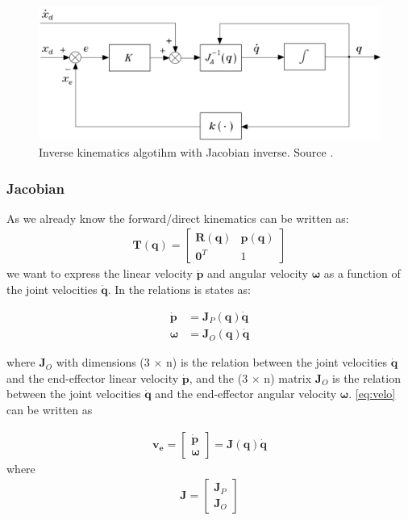 \begin{figure}[htbp]
  \centering
  \includegraphics[width=.9\textwidth]{img/inverseKin.png}
  \caption{Inverse kinematics algotihm with Jacobian inverse. Source \cite{Siciliano}.}
  \label{fig:inverseAlgo}
\end{figure}


\subsubsection*{Jacobian}
As we already know the forward/direct kinematics can be written as:
\begin{align*}
    \bm{T}(\bm{q}) = 
    \begin{bmatrix}
        \bm{R}(\bm{q}) & \bm{p}(\bm{q})\\
        \bm{0}^T & 1
    \end{bmatrix}
\end{align*}
we want to express the linear velocity $\dot{\bm{p}}$ and angular velocity $\bm{\omega}$ as a function of the joint velocities $\dot{\bm{q}}$. In \cite{Siciliano} the relations is states as:

\begin{equation}
    \begin{aligned}\label{eq:velo}
        \dot{\bm{p}} &= \bm{J}_P(\bm{q})\dot{\bm{q}}\\
        \bm{\omega} &= \bm{J}_O(\bm{q})\dot{\bm{q}}
    \end{aligned}
\end{equation}

where $\bm{J}_O$ with dimensions (3 $\times$ n) is the relation between the joint velocities $\dot{\bm{q}}$ and the end-effector linear velocity $\dot{\bm{p}}$, and the (3 $\times$ n) matrix $\bm{J}_O$ is the relation between the joint velocities $\dot{\bm{q}}$ and the end-effector angular velocity $\bm{\omega}$. \eqref{eq:velo} can be written as

\begin{align*}
    \bm{v_e} = 
    \begin{bmatrix}
        \dot{\bm{p}} \\ \bm{\omega}
    \end{bmatrix}
    = \bm{J}(\bm{q})\dot{\bm{q}}
\end{align*}
where
\begin{align*}
    \bm{J} = 
    \begin{bmatrix}
        \bm{J}_P \\ \bm{J}_O
    \end{bmatrix}
\end{align*}

